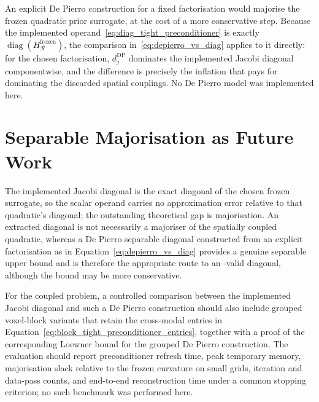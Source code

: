 An explicit De Pierro construction for a fixed factorisation would majorise the frozen quadratic prior surrogate, at the cost of a more conservative step. Because the implemented operand~\eqref{eq:diag_tight_preconditioner} is exactly $\operatorname{diag}(H_{\mathcal R}^{\mathrm{frozen}})$, the comparison in~\eqref{eq:depierro_vs_diag} applies to it directly: for the chosen factorisation, $d_j^{\mathrm{DP}}$ dominates the implemented Jacobi diagonal componentwise, and the difference is precisely the inflation that pays for dominating the discarded spatial couplings. No De Pierro model was implemented here.

\section{Separable Majorisation as Future Work}

The implemented Jacobi diagonal is the exact diagonal of the chosen frozen surrogate, so the scalar operand carries no approximation error relative to that quadratic's diagonal; the outstanding theoretical gap is majorisation. An extracted diagonal is not necessarily a majoriser of the spatially coupled quadratic, whereas a De Pierro separable diagonal constructed from an explicit factorisation as in Equation~\eqref{eq:depierro_vs_diag} provides a genuine separable upper bound and is therefore the appropriate route to an -valid diagonal, although the bound may be more conservative.

For the coupled problem, a controlled comparison between the implemented Jacobi diagonal and such a De Pierro construction should also include grouped voxel-block variants that retain the cross-modal entries in Equation~\eqref{eq:block_tight_preconditioner_entries}, together with a proof of the corresponding Loewner bound for the grouped De Pierro construction. The evaluation should report preconditioner refresh time, peak temporary memory, majorisation slack relative to the frozen curvature on small grids, iteration and data-pass counts, and end-to-end reconstruction time under a common stopping criterion; no such benchmark was performed here.

